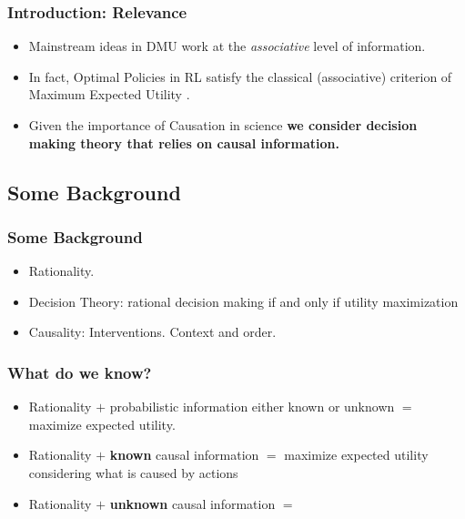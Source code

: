 \documentclass{beamer}
\theoremstyle{plain}
\begin{document}
\begin{frame}
\frametitle{Introduction: Relevance}
\begin{itemize}
\item Mainstream ideas in DMU work at the \textit{associative} level of information.
\item In fact, Optimal Policies in RL satisfy the classical (associative) criterion of Maximum Expected Utility \citep{webb2007game}.
\item Given the importance of Causation in science \textbf{we consider decision making theory that relies on causal information.}
\end{itemize}
\end{frame}

\subsection{Some Background}
\begin{frame}
\frametitle{Some Background}
\begin{itemize}
\item Rationality.
\item Decision Theory: rational decision making if and only if utility maximization
\item Causality: Interventions. Context and order.
\end{itemize}
\end{frame}

\begin{frame}
\frametitle{What do we know?}
\begin{itemize}
\item Rationality $+$ probabilistic information either known or unknown $=$ maximize expected utility.
\item Rationality $+$ \textbf{known} causal information $=$ maximize expected utility considering what is caused by actions \citep{pearl2009causality,lattimoreNIPS2016}
\item Rationality $+$ \textbf{unknown} causal information $=$ \cite{gonzalez2019theorems} 
\end{itemize}
\end{frame}
\end{document}
